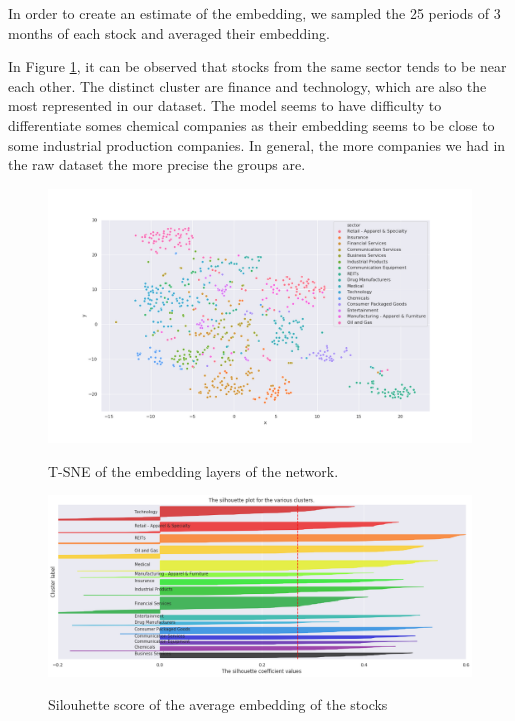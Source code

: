 \documentclass[a4paper,twoside]{article}
\begin{document}
In order to create an estimate of the embedding, we sampled the 25 periods of
3 months of each stock and averaged their embedding. 

In Figure \ref{fig:tsne-embedding}, it can be observed that stocks from the
same sector tends to be near each other. The distinct cluster are finance and
technology, which are also the most represented in our dataset. The model
seems to have difficulty to differentiate somes chemical companies as their
embedding seems to be close to some industrial production companies. In
general, the more companies we had in the raw dataset the more precise the
groups are.

\begin{landscape}
  \begin{figure}    
  \begin{center}
    \label{fig:tsne-embedding}
    \includegraphics[height=\textheight]{./figures/tsne.png}
    \caption{T-SNE of the embedding layers of the network.}
    \end{center}
  \end{figure}

  \begin{figure}    
  \begin{center}
    \label{fig:silhouette-score}
    \includegraphics[height=\textheight]{./figures/silouhette_score}
    \caption{Silouhette score of the average embedding of the stocks}
    \end{center}
  \end{figure}
\end{landscape}
\end{document}
